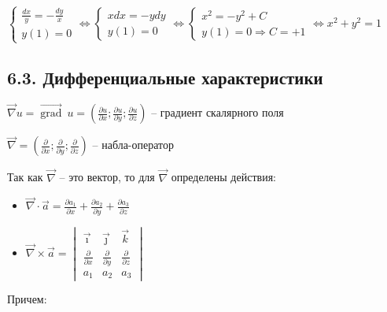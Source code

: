 \documentclass[12pt]{article}
\begin{document}
    $\begin{cases}
        \frac{dx}{y} = -\frac{dy}{x} \\ y(1) = 0
    \end{cases} \Longleftrightarrow \begin{cases}
        xdx = -ydy \\ y(1) = 0
    \end{cases} \Longleftrightarrow \begin{cases}
        x^2 = -y^2 + C \\ y(1) = 0 \Longrightarrow C = +1
    \end{cases} \Longleftrightarrow x^2 + y^2 = 1 $

    \hypertarget{differentialcharacteristics}{}

    \subsection{6.3. Дифференциальные характеристики}

    \Mems $\vec\nabla u = \overrightarrow{\operatorname{grad}} \ u = \left(\frac{\partial u}{\partial x}; \frac{\partial u}{\partial y}; \frac{\partial u}{\partial z}\right)$ -- градиент скалярного поля

    $\vec\nabla = \left(\frac{\partial}{\partial x}; \frac{\partial}{\partial y}; \frac{\partial}{\partial z}\right)$ -- набла-оператор

    \Nota Так как $\vec\nabla$ -- это вектор, то для $\vec\nabla$ определены действия:

    \begin{itemize}
        \item $\vec\nabla \cdot \vec{a} = \frac{\partial a_1}{\partial x} + \frac{\partial a_2}{\partial y} + \frac{\partial a_3}{\partial z}$

        \item $\vec\nabla \times \vec{a} =
        \begin{vmatrix}
            \vec\imath & \vec\jmath & \vec k \\
            \frac{\partial}{\partial x} & \frac{\partial}{\partial y} & \frac{\partial}{\partial z} \\
            a_1 & a_2 & a_3
        \end{vmatrix}$
    \end{itemize}

    Причем:
    
\end{document}
